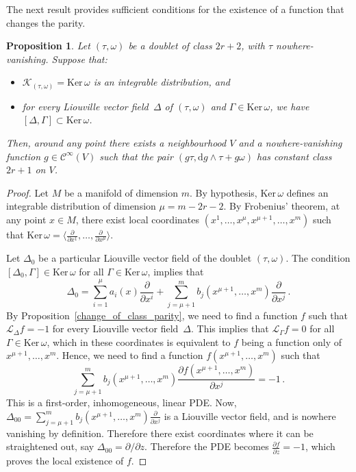 \documentclass[11pt,twoside]{article}
\theoremstyle{plain}
\newtheorem{proposition}[theorem]{Proposition}
\theoremstyle{definition}
\renewcommand{\d}{\mathrm{d}}
\newcommand{\Cinfty}{\mathscr{C}^\infty}
\newcommand{\Lie}{\mathscr{L}}
\def\d{\mathrm{d}}
\newcommand{\fracp}[2]{\frac{\partial #1}{\partial #2}}
\def\d{\mathrm{d}}
\def\Ker{\mathrm{Ker \,}}
\def\Lie{\mathscr{L}}
\def\K{\mathcal{K}}
\begin{document}
The next result provides sufficient conditions for the existence of a function that changes the parity.


\begin{proposition}\label{sufficient_cond_function}
    Let $(\tau,\omega)$ be a doublet of class $2r+2$, with $\tau$ nowhere-vanishing. Suppose that:
    \begin{itemize}
        \item $\K_{(\tau,\omega)} = \Ker \omega$ is an integrable distribution, and
        \item for every Liouville vector field~$\Delta$ of $(\tau,\omega)$ and $\Gamma \in \Ker \omega$, we have $[\Delta,\Gamma] \subset \Ker \omega$.
    \end{itemize}
    Then, around any point there exists a neighbourhood $V$ and a nowhere-vanishing function $g\in \Cinfty(V)$ 
    such that the pair $(g\tau,\d g\wedge \tau + g\omega)$ has constant class $2r+1$ on $V$.
\end{proposition}
\begin{proof}
    Let $M$ be a manifold of dimension $m$. By hypothesis, $\Ker \omega$ defines an integrable distribution of dimension $\mu = m-2r-2$. 
    By Frobenius' theorem, at any point $x \in  M$, there exist local coordinates $(x^1, \dotsc, x^{\mu},x^{\mu+1}, \dots, x^m)$ such that $\Ker \omega = \langle \fracp{}{x^1},\dotsc, \fracp{}{x^{\mu}}  \rangle$. 
    
    Let $\Delta_0$ be a particular Liouville vector field of the  doublet $(\tau,\omega)$. The condition 
    $[\Delta_0 , \Gamma] \in \Ker \omega$
    for all $\Gamma \in \Ker \omega$, implies that
    $$\Delta_ 0 = \sum_{i=1}^\mu a_i(x) \fracp{}{x^i} + \sum_{j=\mu+1}^{m}b_j(x^{\mu+1},\dotsc,x^m)\fracp{}{x^j}\,.$$
    By Proposition~\ref{change_of_class_parity}, we need to find a function $f$ such that $\Lie_\Delta f = -1$ for every Liouville vector field~$\Delta$. This implies 
    that $\Lie_{\Gamma} f = 0$ for all $\Gamma \in \Ker \omega$, which in these coordinates is equivalent to $f$ being a function only of $x^{\mu +1}, \dotsc, x^m$. Hence, we need to find a function $f(x^{\mu+1}, \dotsc,x^m)$ such that
    $$\sum_{j=\mu+1}^{m}b_j(x^{\mu+1},\dotsc,x^m)\fracp{f(x^{\mu+1}, \dotsc,x^m)}{x^j}=-1\,.$$
This is a first-order, inhomogeneous, linear PDE. 
Now,
$
\Delta_{00} = \sum_{j=\mu+1}^{m}b_j(x^{\mu+1},\dotsc,x^m)\fracp{}{x^j}
$
is a Liouville vector field, and is nowhere vanishing by definition.
Therefore there exist coordinates where it can be straightened out,
say
$\Delta_{00} = \partial/\partial z$.
Therefore the PDE becomes
$
\frac{\partial f}{\partial z} = -1 
$,
which proves the local existence of $f$.
\end{proof}
\end{document}
